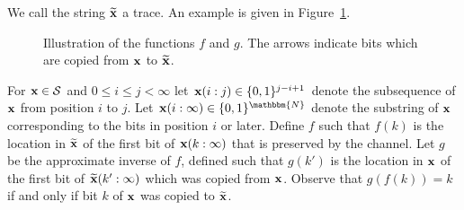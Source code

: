 \documentclass[final,12pt]{colt2018} %
\newcommand{\N}{\mathbbm{N}}
\newcommand{\1}{\mathbf{1}}
\def\cS{\mathcal{S}}
\def\cS{\mathcal{S}}
\newcommand{\wt}{\widetilde}
\def\xt{{\wt {\bf x}}}
\def\x{{\bf x}}
\begin{document}
We call the string $\xt$ a trace.  An example is
given in Figure~\ref{fig:fg}.

\begin{figure}[ht!]
	\centering
	\caption{Illustration of the functions $f$ and $g$.
		The arrows indicate bits which are copied from $\x$ to $\xt$.}
	\label{fig:fg}
\end{figure}

For $\x \in \cS$ and
$0 \leq i \leq j < \infty$ let $\x(i:j) \in \{ 0 , 1 \}^{j-i+1}$
denote the subsequence of $\x$ from position $i$ to $j$.
Let $\x(i:\infty)\in\{0,1\}^\N$ denote the substring of $\x$
corresponding to the bits in position $i$ or later.  Define $f$
such that $f(k)$ is the location in $\xt$ of the first bit of
$\x(k:\infty)$ that is preserved by the channel.  Let $g$ be
the approximate inverse of $f$, defined such that $g(k')$ is
the location in $\x$ of the first bit of $\xt(k':\infty)$ which
was copied from $\x$. Observe that $g(f(k))=k$ if and only if
bit $k$ of $\x$ was copied to $\xt$.
\end{document}
